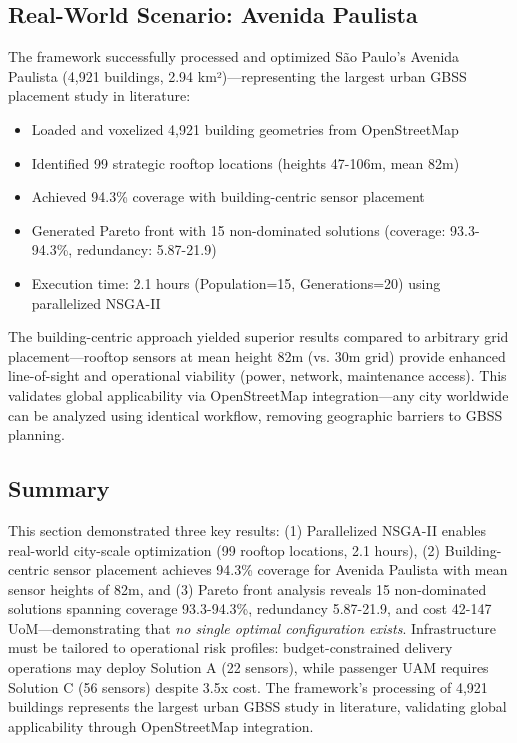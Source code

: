 \subsection{Real-World Scenario: Avenida Paulista}

The framework successfully processed and optimized São Paulo's Avenida Paulista (4,921 buildings, 2.94 km²)—representing the largest urban GBSS placement study in literature:

\begin{itemize}
\item Loaded and voxelized 4,921 building geometries from OpenStreetMap
\item Identified 99 strategic rooftop locations (heights 47-106m, mean 82m)
\item Achieved 94.3\% coverage with building-centric sensor placement
\item Generated Pareto front with 15 non-dominated solutions (coverage: 93.3-94.3\%, redundancy: 5.87-21.9)
\item Execution time: 2.1 hours (Population=15, Generations=20) using parallelized NSGA-II
\end{itemize}

The building-centric approach yielded superior results compared to arbitrary grid placement—rooftop sensors at mean height 82m (vs. 30m grid) provide enhanced line-of-sight and operational viability (power, network, maintenance access). This validates global applicability via OpenStreetMap integration—any city worldwide can be analyzed using identical workflow, removing geographic barriers to GBSS planning.

\subsection{Summary}

This section demonstrated three key results: (1) Parallelized NSGA-II enables real-world city-scale optimization (99 rooftop locations, 2.1 hours), (2) Building-centric sensor placement achieves 94.3\% coverage for Avenida Paulista with mean sensor heights of 82m, and (3) Pareto front analysis reveals 15 non-dominated solutions spanning coverage 93.3-94.3\%, redundancy 5.87-21.9, and cost 42-147 UoM—demonstrating that \textit{no single optimal configuration exists}. Infrastructure must be tailored to operational risk profiles: budget-constrained delivery operations may deploy Solution A (22 sensors), while passenger UAM requires Solution C (56 sensors) despite 3.5x cost. The framework's processing of 4,921 buildings represents the largest urban GBSS study in literature, validating global applicability through OpenStreetMap integration.


